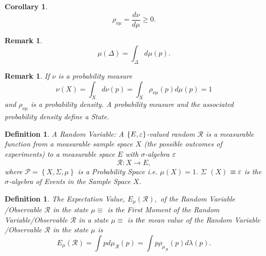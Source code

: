 \documentclass[aps,preprint]{revtex4}%
\providecommand{\U}[1]{\protect\rule{.1in}{.1in}}
\newtheorem{corollary}[theorem]{Corollary}
\newtheorem{definition}[theorem]{Definition}
\newtheorem{remark}[theorem]{Remark}
\begin{document}
\begin{corollary}%
\begin{equation}
\rho_{\nu\mu}=\frac{d\nu}{d%
\mu
}\geq0.
\end{equation}

\end{corollary}

\begin{remark}%
\begin{equation}%
\mu
\left(  \Delta\right)  =\int_{\Delta}d%
\mu
\left(  p\right)  .
\end{equation}

\end{remark}

\begin{remark}
If $\nu$ is a \emph{probability measure}
\begin{equation}
\nu\left(  X\right)  =\int_{X}d\nu\left(  p\right)  =\int_{X}\rho_{\nu\mu
}\left(  p\right)  d%
\mu
\left(  p\right)  =1
\end{equation}
and $\rho_{\nu\mu}$ is a \emph{probability density}. A probability measure and
the associated probability density define a \emph{State}.
\end{remark}

\begin{definition}
A \emph{Random Variable:} A $\left\{  E,{\LARGE \varepsilon}\right\}  $-valued
random $\mathcal{R}$ is a measurable function from a measurable \emph{sample
space} $X$ (the possible outcomes of experiments) to a measurable space $E$
with $\sigma$-algebra ${\LARGE \varepsilon}$
\begin{equation}
\mathcal{R}:X\rightarrow E,
\end{equation}
where $\mathcal{P}=\left\{  X,\Sigma,\mu\right\}  $ is a \emph{Probability
Space i.e. }$\mu\left(  X\right)  =1$. $\Sigma$ $\left(  X\right)  $
$\equiv{\LARGE \varepsilon}$ is the $\sigma$-algebra of \emph{Events} in the
\emph{Sample Space} $X.$
\end{definition}

\begin{definition}
The \emph{Expectation Value,} $E_{\mu}\left(  \mathcal{R}\right)  ,$ of the
Random Variable /Observable $\mathcal{R}$ in the state $\mu\equiv$ is the
\emph{First Moment} of the Random Variable/Observable $\mathcal{R}$ in a state
$\mu\equiv$ is $\emph{the}$ \emph{mean} value of the Random Variable
/Observable $\mathcal{R}$ in the state $\mu$ is
\begin{equation}
E_{\mu}\left(  \mathcal{R}\right)  =\int pd\mu_{\mathcal{R}}\left(  p\right)
=\int p\rho_{\mu_{\mathcal{R}}}\left(  p\right)  d\lambda\left(  p\right)  .
\end{equation}

\end{definition}
\end{document}
